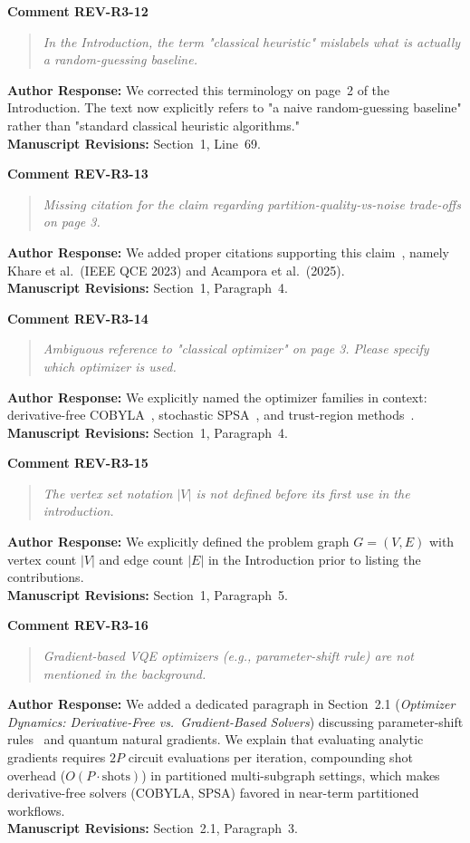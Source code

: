 \documentclass[11pt,a4paper]{article}
\newcommand{\commentbox}[2]{
    \vspace{0.8em}
    \noindent\textbf{\textcolor{commentcolor}{#1}}
    \vspace{0.2em}
    \begin{quote}
        \small\itshape #2
    \end{quote}
}
\newcommand{\responsebox}[1]{
    \noindent\textbf{\textcolor{responsecolor}{Author Response:}} #1
    \vspace{0.8em}
}
\begin{document}
\commentbox{Comment REV-R3-12}{In the Introduction, the term "classical heuristic" mislabels what is actually a random-guessing baseline.}

\responsebox{We corrected this terminology on page~2 of the Introduction. The text now explicitly refers to "a naive random-guessing baseline" rather than "standard classical heuristic algorithms."
\\[0.3em]
\textbf{Manuscript Revisions:} Section~1, Line~69.}

\commentbox{Comment REV-R3-13}{Missing citation for the claim regarding partition-quality-vs-noise trade-offs on page 3.}

\responsebox{We added proper citations supporting this claim~\cite{Khare2023ParallelizingQWE, Acampora2025QuantumCAR}, namely Khare et al.\ (IEEE QCE 2023) and Acampora et al.\ (2025).
\\[0.3em]
\textbf{Manuscript Revisions:} Section~1, Paragraph~4.}

\commentbox{Comment REV-R3-14}{Ambiguous reference to "classical optimizer" on page 3. Please specify which optimizer is used.}

\responsebox{We explicitly named the optimizer families in context: derivative-free COBYLA~\cite{Powell1994ADF}, stochastic SPSA~\cite{Spall1992MultivariateSA}, and trust-region methods~\cite{dzahini2025noise}.
\\[0.3em]
\textbf{Manuscript Revisions:} Section~1, Paragraph~4.}

\commentbox{Comment REV-R3-15}{The vertex set notation $|V|$ is not defined before its first use in the introduction.}

\responsebox{We explicitly defined the problem graph $G=(V, E)$ with vertex count $|V|$ and edge count $|E|$ in the Introduction prior to listing the contributions.
\\[0.3em]
\textbf{Manuscript Revisions:} Section~1, Paragraph~5.}

\commentbox{Comment REV-R3-16}{Gradient-based VQE optimizers (e.g., parameter-shift rule) are not mentioned in the background.}

\responsebox{We added a dedicated paragraph in Section~2.1 (\textit{Optimizer Dynamics: Derivative-Free vs.\ Gradient-Based Solvers}) discussing parameter-shift rules~\cite{Mitarai2018QuantumCA} and quantum natural gradients. We explain that evaluating analytic gradients requires $2P$ circuit evaluations per iteration, compounding shot overhead ($O(P \cdot \text{shots})$) in partitioned multi-subgraph settings, which makes derivative-free solvers (COBYLA, SPSA) favored in near-term partitioned workflows.
\\[0.3em]
\textbf{Manuscript Revisions:} Section~2.1, Paragraph~3.}
\end{document}
